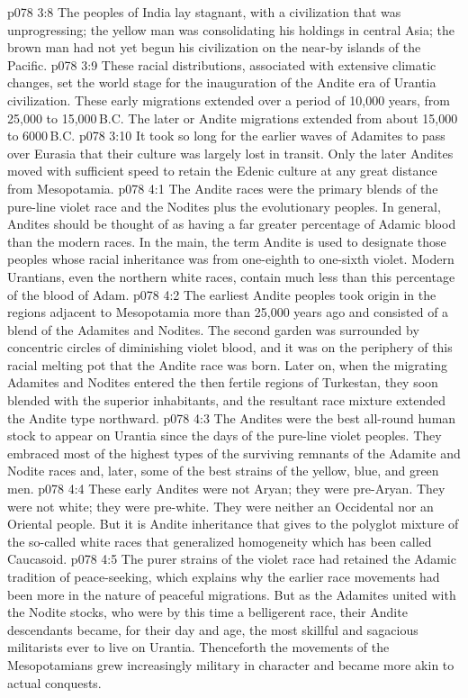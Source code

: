 \vs p078 3:8 The peoples of India lay stagnant, with a civilization that was unprogressing; the yellow man was consolidating his holdings in central Asia; the brown man had not yet begun his civilization on the near-by islands of the Pacific.
\vs p078 3:9 \pc These racial distributions, associated with extensive climatic changes, set the world stage for the inauguration of the Andite era of Urantia civilization. These early migrations extended over a period of 10,000 years, from 25,000 to 15,000\,B.C. The later or Andite migrations extended from about 15,000 to 6000\,B.C.
\vs p078 3:10 It took so long for the earlier waves of Adamites to pass over Eurasia that their culture was largely lost in transit. Only the later Andites moved with sufficient speed to retain the Edenic culture at any great distance from Mesopotamia.
\vs p078 4:1 The Andite races were the primary blends of the pure\hyp{}line violet race and the Nodites plus the evolutionary peoples. In general, Andites should be thought of as having a far greater percentage of Adamic blood than the modern races. In the main, the term Andite is used to designate those peoples whose racial inheritance was from one\hyp{}eighth to one\hyp{}sixth violet. Modern Urantians, even the northern white races, contain much less than this percentage of the blood of Adam.
\vs p078 4:2 The earliest Andite peoples took origin in the regions adjacent to Mesopotamia more than 25,000 years ago and consisted of a blend of the Adamites and Nodites. The second garden was surrounded by concentric circles of diminishing violet blood, and it was on the periphery of this racial melting pot that the Andite race was born. Later on, when the migrating Adamites and Nodites entered the then fertile regions of Turkestan, they soon blended with the superior inhabitants, and the resultant race mixture extended the Andite type northward.
\vs p078 4:3 The Andites were the best all\hyp{}round human stock to appear on Urantia since the days of the pure\hyp{}line violet peoples. They embraced most of the highest types of the surviving remnants of the Adamite and Nodite races and, later, some of the best strains of the yellow, blue, and green men.
\vs p078 4:4 \pc These early Andites were not Aryan; they were pre\hyp{}Aryan. They were not white; they were pre\hyp{}white. They were neither an Occidental nor an Oriental people. But it is Andite inheritance that gives to the polyglot mixture of the so\hyp{}called white races that generalized homogeneity which has been called Caucasoid.
\vs p078 4:5 \pc The purer strains of the violet race had retained the Adamic tradition of peace\hyp{}seeking, which explains why the earlier race movements had been more in the nature of peaceful migrations. But as the Adamites united with the Nodite stocks, who were by this time a belligerent race, their Andite descendants became, for their day and age, the most skillful and sagacious militarists ever to live on Urantia. Thenceforth the movements of the Mesopotamians grew increasingly military in character and became more akin to actual conquests.
